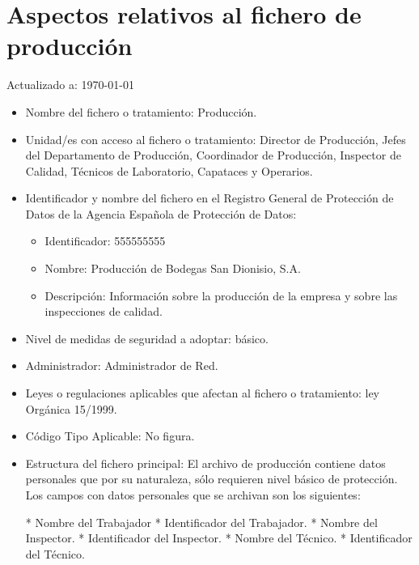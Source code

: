 \documentclass[a4paper,11pt,bibtotoc,noliststotoc]{scrbook}
\newcommand{\laorganizacion}{Bodegas San Dionisio, S.A.}
\begin{document}
\section{Aspectos relativos al fichero de producción}


Actualizado a: \today

\begin{itemize}
\item Nombre del fichero o tratamiento: Producción.

\item Unidad/es con acceso al fichero o tratamiento: Director de Producción, Jefes del Departamento de Producción, Coordinador de Producción, Inspector de Calidad, Técnicos de Laboratorio, Capataces y Operarios.

\item Identificador y nombre del fichero en el Registro General de Protección de Datos de la Agencia Española de Protección de Datos: 
	\begin{itemize}
	\item Identificador: 555555555
	\item Nombre: Producción de \laorganizacion
	\item Descripción: Información sobre la producción de la empresa y sobre las inspecciones de calidad.
	\end{itemize}

\item Nivel de medidas de seguridad a adoptar: básico.

\item Administrador: Administrador de Red.

\item Leyes o regulaciones aplicables que afectan al fichero o tratamiento: ley Orgánica 15/1999.

\item Código Tipo Aplicable: No figura.

\item Estructura del fichero principal: 
El archivo de producción contiene datos personales que por su naturaleza, sólo requieren nivel básico de protección. Los campos con datos personales que se archivan son los siguientes:

* Nombre del Trabajador
* Identificador del Trabajador.
* Nombre del Inspector.
* Identificador del Inspector.
* Nombre del Técnico.
* Identificador del Técnico.


\end{itemize}
\end{document}

